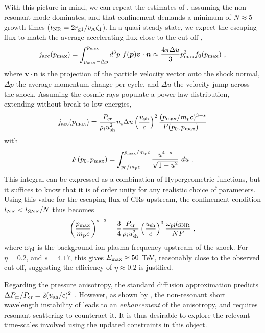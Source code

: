 \documentclass[a4paper,fleqn,usenatbib]{mnras}
\begin{document}
With this picture in mind, we can repeat the estimates of \cite{Bell13}, assuming the non-resonant mode dominates, and that confinement demands a minimum of $N\approx5$ growth times ($t_{\rm NR} = 2r_{\rm g1}/v_{\rm A}\zeta_1$). In a quasi-steady state, we expect the escaping flux to match the average accelerating flux close to the cut-off
\citep{Drury99},
\begin{align}
j_{\rm acc}(p_{\rm max}) = 
\int_{p_{\rm max}-\Delta p}^{p_{\rm max}} d^3 p~ f(\bm{p}) \bm {v}\cdot\bm{n} 
\approx  \frac{4\pi \Delta u}{3}p_{\rm max}^3 f_0(p_{\rm max})~,
\end{align}
where $\bm{v}\cdot\bm{n}$ is the projection of the particle velocity vector onto the shock normal, $\Delta p$ the average momentum change per cycle, and $\Delta u$ the velocity jump across the shock. Assuming the  cosmic-rays populate a power-law distribution, extending without break to low energies, 
\begin{align}
j_{\rm acc}(p_{\rm max}) = \frac{P_{\rm cr}}{\rho_i u_{\rm sh}^2} n_i \Delta u 
\left(\frac{u_{\rm sh}}{c}\right)^2 \frac{(p_{\rm max}/m_pc)^{3-s}}{F(p_0, p_{\rm max})~~}
\end{align}
with
\begin{align*}
F(p_0, p_{\rm max}) = \int_{p_0/m_pc}^{p_{\rm max}/m_pc}\frac{u^{4-s}}{\sqrt{1+u^2}} ~du~.
\end{align*}
This integral can be expressed as a combination of Hypergeometric functions, but it suffices to know that it is of order unity for any realistic choice of parameters. 
Using this value for the escaping flux of CRs upstream, the confinement condition $t_{\rm NR} < t_{\rm SNR}/N$ thus becomes
\begin{align}
\left(\frac{p_{\rm max}}{m_{\rm p}c}\right)^{s-3} = \frac{3}{4}\frac{P_{\rm cr}}{\rho_i u_{\rm sh}^2} \left(\frac{u_{\rm sh}}{c}\right)^3 \frac{\omega_{\rm pi} t_{\rm SNR}}{N F }~,
\end{align}
where $\omega_{\rm pi}$ is the background ion plasma frequency upstream of the shock. For $\eta=0.2$, 
and $s=4.17$, this gives $E_{\rm max} \approx 50$ TeV, reasonably close to the observed cut-off, suggesting the efficiency of $\eta \approx 0.2$ is justified.

Regarding the pressure anisotropy,  the standard diffusion approximation predicts $\Delta P_{\rm cr}/P_{\rm cr} = 2 (u_{\rm sh}/c)^2$ \citep{JokipiiWilliams}. However, as shown by \cite{LuoMelrose}, the non-resonant short wavelength instability of \cite{Bell04} leads to an \emph{enhancement} of the anisotropy, and requires resonant scattering to counteract it. It is thus desirable to explore the relevant time-scales involved using the updated constraints in this object.
\end{document}
